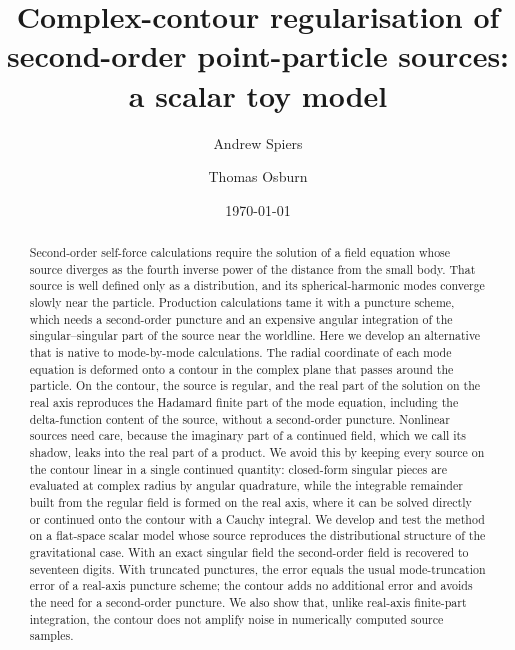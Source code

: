 \documentclass[aps,prd,twocolumn,superscriptaddress,nofootinbib,floatfix]{revtex4-2}
\begin{document}
\title{Complex-contour regularisation of second-order point-particle sources:\\ a scalar toy model}

\author{Andrew Spiers}

\author{Thomas Osburn}
\affiliation{~} %

\date{\today}

\begin{abstract}
Second-order self-force calculations require the solution of a field equation whose source diverges as the fourth inverse power of the distance from the small body.
That source is well defined only as a distribution, and its spherical-harmonic modes converge slowly near the particle.
Production calculations tame it with a puncture scheme, which needs a second-order puncture and an expensive angular integration of the singular--singular part of the source near the worldline.
Here we develop an alternative that is native to mode-by-mode calculations.
The radial coordinate of each mode equation is deformed onto a contour in the complex plane that passes around the particle.
On the contour, the source is regular, and the real part of the solution on the real axis reproduces the Hadamard finite part of the mode equation, including the delta-function content of the source, without a second-order puncture.
Nonlinear sources need care, because the imaginary part of a continued field, which we call its shadow, leaks into the real part of a product.
We avoid this by keeping every source on the contour linear in a single continued quantity: closed-form singular pieces are evaluated at complex radius by angular quadrature, while the integrable remainder built from the regular field is formed on the real axis, where it can be solved directly or continued onto the contour with a Cauchy integral.
We develop and test the method on a flat-space scalar model whose source reproduces the distributional structure of the gravitational case.
With an exact singular field the second-order field is recovered to seventeen digits.
With truncated punctures, the error equals the usual mode-truncation error of a real-axis puncture scheme; the contour adds no additional error and avoids the need for a second-order puncture.
We also show that, unlike real-axis finite-part integration, the contour does not amplify noise in numerically computed source samples.
\end{abstract}
\end{document}

